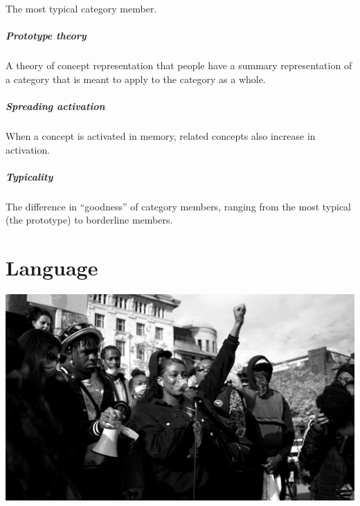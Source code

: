 \documentclass[
]{krantz}
\begin{document}
The most typical category member.

\paragraph*{Prototype theory}\label{prototype-theory}

A theory of concept representation that people have a summary representation of a category that is meant to apply to the category as a whole.

\paragraph*{Spreading activation}\label{spreading-activation}

When a concept is activated in memory, related concepts also increase in activation.

\paragraph*{Typicality}\label{typicality-1}

The difference in ``goodness'' of category members, ranging from the most typical (the prototype) to borderline members.

\chapter{Language}\label{language}

\begin{center}\includegraphics[width=1\linewidth]{images/ch8/cover} \end{center}
\end{document}
